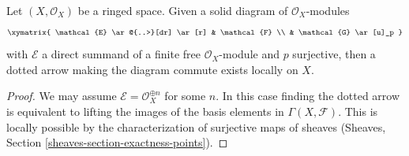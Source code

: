 \begin{lemma}
\label{lemma-local-lift-map}
Let $(X, \mathcal{O}_X)$ be a ringed space.
Given a solid diagram of $\mathcal{O}_X$-modules
$$
\xymatrix{
\mathcal{E} \ar@{..>}[dr] \ar[r] & \mathcal{F} \\
& \mathcal{G} \ar[u]_p
}
$$
with $\mathcal{E}$ a direct summand of a finite free
$\mathcal{O}_X$-module and $p$ surjective, then a dotted arrow
making the diagram commute exists locally on $X$.
\end{lemma}

\begin{proof}
We may assume $\mathcal{E} = \mathcal{O}_X^{\oplus n}$ for some $n$.
In this case finding the dotted arrow is equivalent to lifting the
images of the basis elements in $\Gamma(X, \mathcal{F})$. This is
locally possible by the characterization of surjective maps of
sheaves (Sheaves, Section \ref{sheaves-section-exactness-points}).
\end{proof}
